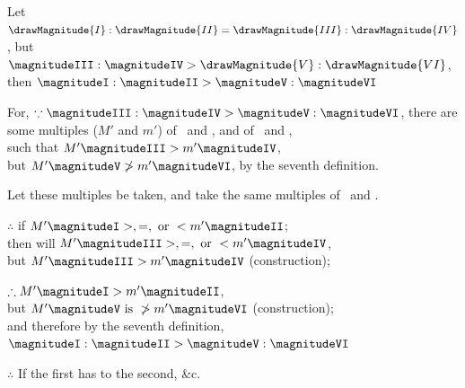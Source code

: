 \documentclass[booklanguage=english]{byrnebook}
\begin{document}
\begin{center}
Let $\drawMagnitude{I} : \drawMagnitude{II} = \drawMagnitude{III} : \drawMagnitude{IV}$, but $\magnitudeIII : \magnitudeIV > \drawMagnitude{V} : \drawMagnitude{VI}$,\\
then $\magnitudeI : \magnitudeII > \magnitudeV : \magnitudeVI$

For, $\because \magnitudeIII : \magnitudeIV > \magnitudeV : \magnitudeVI$, there are some multiples ($M'$ and $m'$) of \magnitudeIII\ and \magnitudeV, and of \magnitudeIV\ and \magnitudeVI,\\ %
such that $M' \magnitudeIII > m' \magnitudeIV$,\\
but $M' \magnitudeV \ngtr m' \magnitudeVI$, by the seventh definition. %

Let these multiples be taken, and take the same multiples of \magnitudeI\ and \magnitudeII.

$\therefore$  if $M' \magnitudeI >, =, \mbox{ or } < m' \magnitudeII$;\\
then will $M' \magnitudeIII >, =, \mbox{ or } < m' \magnitudeIV$,\\
but $M' \magnitudeIII > m' \magnitudeIV$ (construction);

$\therefore M' \magnitudeI > m' \magnitudeII$,\\
but $M' \magnitudeV \mbox{ is } \ngtr m' \magnitudeVI$ (construction);\\ %
and therefore by the seventh definition,\\
$\magnitudeI : \magnitudeII > \magnitudeV : \magnitudeVI$

$\therefore$ If the first has to the second, \&c.
\end{center}

\vfill\pagebreak

\end{document}
